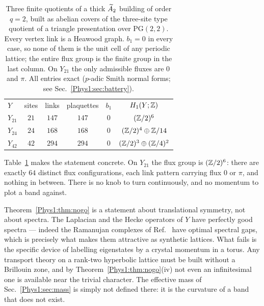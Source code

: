 \begin{table}[t]
\centering
\begin{ruledtabular}
\begin{tabular}{lccccc}
$Y$ & sites & links & plaquettes & $b_1$ & $H_1(Y;\mathbb{Z})$\\
\colrule
$Y_{21}$ & $21$ & $147$ & $147$ & $0$ & $(\mathbb{Z}/2)^{6}$\\
$Y_{24}$ & $24$ & $168$ & $168$ & $0$ & $(\mathbb{Z}/2)^{4}\oplus\mathbb{Z}/14$\\
$Y_{42}$ & $42$ & $294$ & $294$ & $0$ & $(\mathbb{Z}/2)^{3}\oplus(\mathbb{Z}/4)^{2}$\\
\end{tabular}
\end{ruledtabular}
\caption{Three finite quotients of a thick $\widetilde A_2$ building of order $q=2$, built as
abelian covers of the three-site type quotient of a triangle presentation over
$\mathrm{PG}(2,2)$. Every vertex link is a Heawood graph. $b_1=0$ in every case, so none of
them is the unit cell of any periodic lattice; the entire flux group is the finite group in
the last column. On $Y_{21}$ the only admissible fluxes are $0$ and $\pi$. All entries
exact ($p$-adic Smith normal forms; see Sec.~\ref{Phys1:sec:battery}).}
\label{Phys1:tab:ranktwo}
\end{table}

Table~\ref{Phys1:tab:ranktwo} makes the statement concrete. On $Y_{21}$ the flux group is
$(\mathbb{Z}/2)^{6}$: there are exactly $64$ distinct flux configurations, each link pattern
carrying flux $0$ or $\pi$, and nothing in between. There is no knob to turn continuously,
and no momentum to plot a band against.

\begin{remark}\label{Phys1:rem:notsay}
Theorem~\ref{Phys1:thm:nogo} is a statement about translational symmetry, not about spectra. The
Laplacian and the Hecke operators of $Y$ have perfectly good spectra --- indeed the
Ramanujan complexes of Ref.~ have optimal spectral gaps, which is precisely
what makes them attractive as synthetic lattices. What fails is the specific device of
labelling eigenstates by a crystal momentum in a torus. Any transport theory on a rank-two
hyperbolic lattice must be built without a Brillouin zone, and by
Theorem~\ref{Phys1:thm:nogo}(iv) not even an infinitesimal one is available near the trivial
character. The effective mass of Sec.~\ref{Phys1:sec:mass} is simply not defined there: it is
the curvature of a band that does not exist.
\end{remark}

